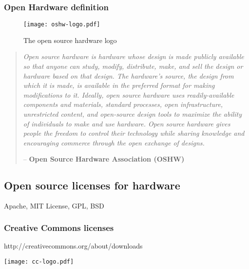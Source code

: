 \subsubsection{Open Hardware definition} %

\begin{figure}[]
    \begin{center}
        \texttt{[image: oshw-logo.pdf]}
    \end{center}
    \caption{The open source hardware logo}
    \label{fig:ohw-logo}
\end{figure}

\begin{quotation}
  \emph{Open source hardware is hardware whose design is made publicly available so that anyone can study, modify, distribute, make, and sell the design or hardware based on that design. The hardware’s source, the design from which it is made, is available in the preferred format for making modifications to it. Ideally, open source hardware uses readily-available components and materials, standard processes, open infrastructure, unrestricted content, and open-source design tools to maximize the ability of individuals to make and use hardware. Open source hardware gives people the freedom to control their technology while sharing knowledge and encouraging commerce through the open exchange of designs.}

  -- \textbf{Open Source Hardware Association (OSHW)}
\end{quotation}


\subsection{Open source licenses for hardware} %



Apache, MIT License, GPL, BSD
\subsubsection{Creative Commons licenses} %



http://creativecommons.org/about/downloads
\begin{NFfigure}
    \begin{center}
        \texttt{[image: cc-logo.pdf]}
    \end{center}
    \caption{Creative Commons logo}
    \label{fig:cc-logo}
\end{NFfigure}

